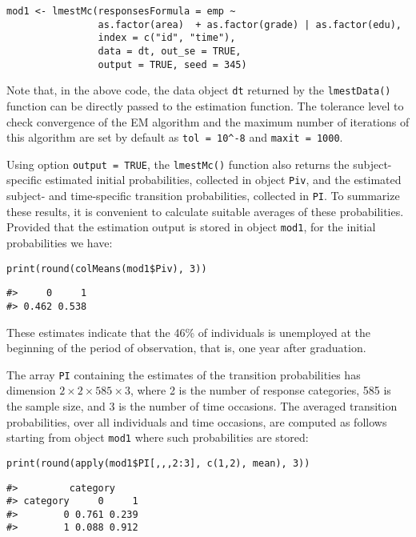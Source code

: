 \begin{verbatim}
mod1 <- lmestMc(responsesFormula = emp ~
                as.factor(area)  + as.factor(grade) | as.factor(edu),
                index = c("id", "time"),
                data = dt, out_se = TRUE, 
                output = TRUE, seed = 345)
\end{verbatim}

Note that, in the above code, the data object \texttt{dt} returned by the
\texttt{lmestData()} function can be directly passed to the estimation
function. The tolerance level to check convergence of the EM algorithm
and the maximum number of iterations of this algorithm are set by
default as \texttt{tol\ =\ 10\^{}-8} and \texttt{maxit\ =\ 1000}.

Using option \texttt{output\ =\ TRUE}, the \texttt{lmestMc()} function also returns the
subject-specific estimated initial probabilities, collected in object
\texttt{Piv}, and the estimated subject- and time-specific transition
probabilities, collected in \texttt{PI}. To summarize these results, it is
convenient to calculate suitable averages of these probabilities.
Provided that the estimation output is stored in object \texttt{mod1}, for the
initial probabilities we have:

\begin{verbatim}
print(round(colMeans(mod1$Piv), 3))
\end{verbatim}

\begin{verbatim}
#>     0     1 
#> 0.462 0.538
\end{verbatim}

\noindent These estimates indicate that the 46\% of individuals is
unemployed at the beginning of the period of observation, that is, one
year after graduation.

The array \texttt{PI} containing the estimates of the transition probabilities
has dimension \(2 \times 2 \times 585 \times 3\), where 2 is the number of
response categories, 585 is the sample size, and 3 is the number of time
occasions. The averaged transition probabilities, over all individuals
and time occasions, are computed as follows starting from object \texttt{mod1}
where such probabilities are stored:

\begin{verbatim}
print(round(apply(mod1$PI[,,,2:3], c(1,2), mean), 3))
\end{verbatim}

\begin{verbatim}
#>         category
#> category     0     1
#>        0 0.761 0.239
#>        1 0.088 0.912
\end{verbatim}

